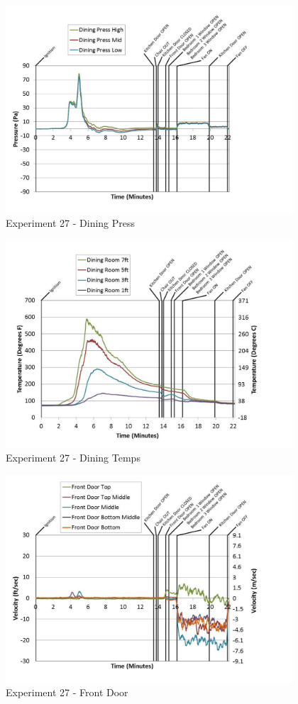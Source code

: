 \documentclass{article}
\begin{document}
\begin{appendices}
	\clearpage

	\begin{figure}[h!]
		\centering
		\includegraphics[height=3.05in]{0_Images/Results_Charts/Exp_27_Charts/DiningPress.pdf}
		\caption{Experiment 27 - Dining Press}
	\end{figure}
 

	\begin{figure}[h!]
		\centering
		\includegraphics[height=3.05in]{0_Images/Results_Charts/Exp_27_Charts/DiningTemps.pdf}
		\caption{Experiment 27 - Dining Temps}
	\end{figure}
 
	\clearpage

	\begin{figure}[h!]
		\centering
		\includegraphics[height=3.05in]{0_Images/Results_Charts/Exp_27_Charts/FrontDoor.pdf}
		\caption{Experiment 27 - Front Door}
	\end{figure}
 


\end{appendices}
\end{document}
